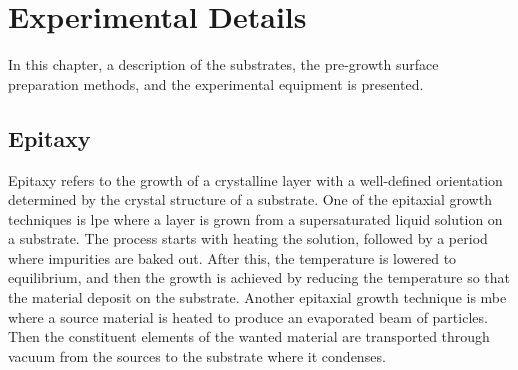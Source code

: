 
\chapter{Experimental Details}\label{ch:exp-details}
In this chapter, a description of the substrates, the pre-growth surface preparation methods, and the experimental equipment is presented.

\section{Epitaxy}

Epitaxy refers to the growth of a crystalline layer with a well-defined orientation determined by the crystal structure of a substrate. One of the epitaxial growth techniques is \acf{lpe} where a layer is grown from a supersaturated liquid solution on a substrate. The process starts with heating the solution, followed by a period where impurities are baked out. After this, the temperature is lowered to equilibrium, and then the growth is achieved by reducing the temperature so that the material deposit on the substrate. Another epitaxial growth technique is \acf{mbe} where a source material is heated to produce an evaporated beam of particles. Then the constituent elements of the wanted material are transported through vacuum from the sources to the substrate where it condenses.

